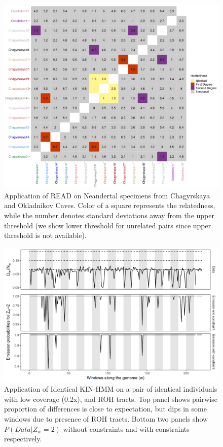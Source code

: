 \documentclass[12pt, letterpaper]{article}
\begin{document}
\begin{figure}[h!]
    \includegraphics[width=18cm]{supplementary_info/plots/fil0_read_plot.png}
    \centering
    \caption{Application of READ on Neandertal specimens from Chagyrskaya and Okladnikov Caves. Color of a square represents the relatedness, while the number denotes standard deviations away from the upper threshold (we show lower threshold for unrelated pairs since upper threshold is not available).}
    \label{figS2:Chagyrskaya_READ}
\end{figure}


\begin{figure}[h!]
    \includegraphics[width=18cm]{supplementary_info/plots/contam0_inbred1_run57_coverage0.2_asc0_inputMode_hapProbs_fil0_pair0_15_relid_emissions_bnds.png}
    \centering
    \caption{Application of Identical KIN-HMM on a pair of identical individuals with low coverage (0.2x), and ROH tracts. Top panel shows pairwise proportion of differences is close to expectation, but dips in some windows due to presence of ROH tracts. Bottom two panels show $P(Data|Z_w=2)$ without constraints and with constraints respectively.}
    \label{figS3:bnds}
\end{figure}
\end{document}
